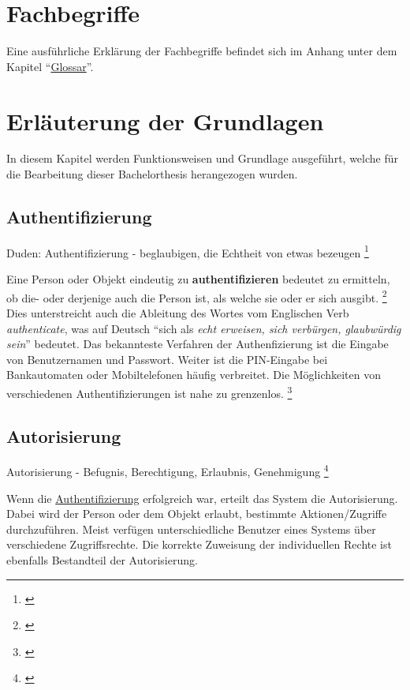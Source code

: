 \section{Fachbegriffe}\label{fachbegriffe}

Eine ausführliche Erklärung der Fachbegriffe befindet sich im Anhang
unter dem Kapitel ``\protect\hyperlink{glossar}{Glossar}''.

\section{Erläuterung der
Grundlagen}\label{erluxe4uterung-der-grundlagen}

In diesem Kapitel werden Funktionsweisen und Grundlage ausgeführt,
welche für die Bearbeitung dieser Bachelorthesis herangezogen wurden.

\hypertarget{authentifizierung}{\subsection{Authentifizierung}\label{authentifizierung}}

Duden: Authentifizierung - beglaubigen, die Echtheit von etwas bezeugen
\footnote{\autocite{duden}}

Eine Person oder Objekt eindeutig zu \textbf{authentifizieren} bedeutet
zu ermitteln, ob die- oder derjenige auch die Person ist, als welche sie
oder er sich ausgibt. \footnote{\autocite{authentifizierungsdef}} Dies
unterstreicht auch die Ableitung des Wortes vom Englischen Verb
\emph{authenticate}, was auf Deutsch ``sich als \emph{echt erweisen,
sich verbürgen, glaubwürdig sein}'' bedeutet. Das bekannteste Verfahren
der Authenfizierung ist die Eingabe von Benutzernamen und Passwort.
Weiter ist die PIN-Eingabe bei Bankautomaten oder Mobiltelefonen häufig
verbreitet. Die Möglichkeiten von verschiedenen Authentifizierungen ist
nahe zu grenzenlos. \footnote{\autocite{authentifizierungsdeforg}}

\subsection{Autorisierung}\label{autorisierung}

Autorisierung - Befugnis, Berechtigung, Erlaubnis, Genehmigung
\footnote{\autocite{duden}}

Wenn die \protect\hyperlink{authentifizierung}{Authentifizierung}
erfolgreich war, erteilt das System die Autorisierung. Dabei wird der
Person oder dem Objekt erlaubt, bestimmte Aktionen/Zugriffe
durchzuführen. Meist verfügen unterschiedliche Benutzer eines Systems
über verschiedene Zugriffsrechte. Die korrekte Zuweisung der
individuellen Rechte ist ebenfalls Bestandteil der Autorisierung.


